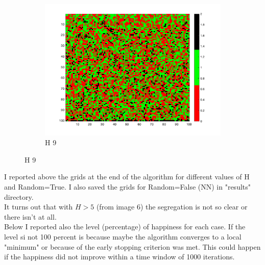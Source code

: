 \documentclass[unicode,11pt,a4paper,oneside,numbers=endperiod,openany]{scrartcl}
\begin{document}
\begin{figure}[H]
\begin{subfigure}[b]{0.3\textwidth}
        \includegraphics[width=\textwidth]{results/iterations_1002_H_9_random_1.png}
        \caption{H 9}
        \label{fig:image9}
      \end{subfigure}
      
\end{figure}
I reported above the grids at the end of the algorithm for different values of H and Random=True. 
I also saved the grids for Random=False (NN) in "results" directory. \\
It turns out that with $H>5$ (from image 6) the segregation is not so clear or there isn't at all. \\
Below I reported also the level (percentage) of happiness for each case. If the level si not 100 percent is because maybe the algorithm converges to a local "minimum" or because of the early stopping criterion was met. This could happen if the happiness did not improve within a time window of 1000 iterations. 
\end{document}
